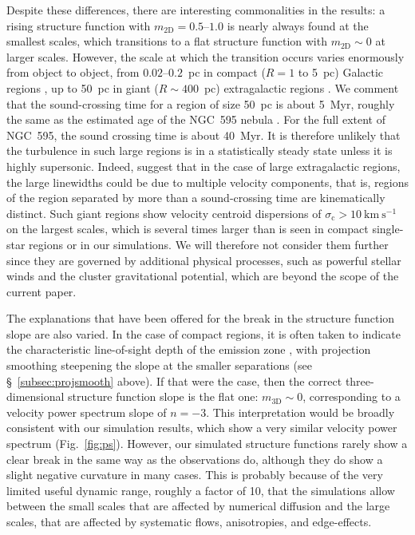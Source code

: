 \documentclass[useAMS,usenatbib]{mn2e}
\begin{document}
Despite these differences, there are interesting commonalities in the
results: a rising structure function with \(m_{\mathrm{2D}} =
0.5\)--\(1.0\) is nearly always found at the smallest scales, which
transitions to a flat structure function with \(m_{\mathrm{2D}} \sim
0\) at larger scales.  However, the scale at which the transition
occurs varies enormously from object to object, from
\(0.02\)--\(0.2\)~pc in compact ($R = 1$ to 5~pc) Galactic \hii{}
regions \citep{1987ApJ...317..676O, 1988ApJS...67...93C,
  1993ApJ...409..262W, 1995ApJ...454..316M}, up to 50~pc in giant (\(R
\sim 400\)~pc) extragalactic regions \citep{2011MNRAS.413..721L}. We
comment that the sound-crossing time for a region of size 50~pc is
about 5~Myr, roughly the same as the estimated age of the NGC~595
nebula \citep{1990ApJ...364..496D}. For the full extent of NGC~595,
the sound crossing time is about 40~Myr. It is therefore unlikely that
the turbulence in such large regions is in a statistically steady
state unless it is highly supersonic. Indeed,
\citet{1988AA...198..283O} suggest that in the case of large
extragalactic \hii{} regions, the large linewidths could be due to
multiple velocity components, that is, regions of the \hii{} region
separated by more than a sound-crossing time are kinematically
distinct.  Such giant \hii{} regions show velocity centroid
dispersions of \(\sigma_{\mathrm{c}} > 10~\mathrm{km\ s^{-1}}\) on the
largest scales, which is several times larger than is seen in compact
single-star regions or in our simulations.  We will therefore not
consider them further since they are governed by additional physical
processes, such as powerful stellar winds and the cluster
gravitational potential, which are beyond the scope of the current
paper.


The explanations that have been offered for the break in the structure
function slope are also varied.  In the case of compact \hii{}
regions, it is often taken to indicate the characteristic
line-of-sight depth of the emission zone \citep{1951ZA.....30...17V,
  1987ApJ...317..686O}, with projection smoothing steepening the slope
at the smaller separations (see \S~\ref{subsec:projsmooth} above).
If that were the case, then the correct three-dimensional structure
function slope is the flat one: \(m_{\mathrm{3D}} \sim 0\),
corresponding to a velocity power spectrum slope of \(n = -3\).  This
interpretation would be broadly consistent with our simulation
results, which show a very similar velocity power spectrum
(Fig.~\ref{fig:ps}).  However, our simulated structure functions
rarely show a clear break in the same way as the observations do,
although they do show a slight negative curvature in many cases.  This
is probably because of the very limited useful dynamic range, roughly
a factor of 10, that the simulations allow between the small scales
that are affected by numerical diffusion and the large scales, that
are affected by systematic flows, anisotropies, and edge-effects.
\end{document}

